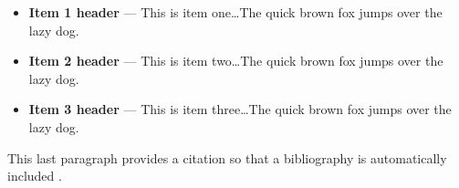 \documentclass[11pt]{article}%
\begin{document}
\begin{multicols}{2}
\begin{itemize}
\item {\bf Item 1 header} --- This is item one\dots The quick brown fox jumps
over the lazy dog.
\item {\bf Item 2 header} --- This is item two\dots The quick brown fox jumps
over the lazy dog.
\item {\bf Item 3 header} --- This is item three\dots The quick brown fox jumps
over the lazy dog.
\end{itemize}

This last paragraph provides a citation so that a bibliography is
automatically included \cite{book:algorithms-4th-ed}.

\printbibliography %


\end{multicols}
\end{document}
